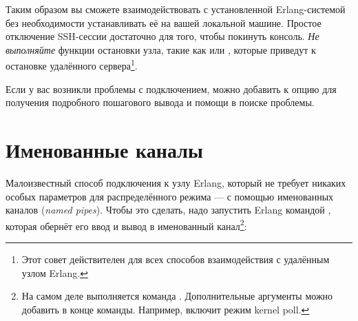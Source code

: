 Таким образом вы сможете взаимодействовать с установленной Erlang-системой без необходимости устанавливать её на вашей локальной машине. Простое отключение SSH-сессии достаточно для того, чтобы покинуть консоль. \emph{Не выполняйте} функции остановки узла, такие как  или , которые приведут к остановке удалённого сервера\footnote{Этот совет действителен для всех способов взаимодействия с удалённым узлом Erlang.}.

Если у вас возникли проблемы с подключением, можно добавить к  опцию  для получения подробного пошагового вывода и помощи в поиске проблемы.


\section{Именованные каналы}

Малоизвестный способ подключения к узлу Erlang, который не требует никаких особых параметров для распределённого режима --- с помощью именованных каналов (\emph{named pipes}). Чтобы это сделать, надо запустить Erlang командой , которая обернёт его ввод и вывод в именованный канал\footnote{На самом деле выполняется команда . Дополнительные аргументы можно добавить в конце команды. Например,  включит режим kernel poll.}:


